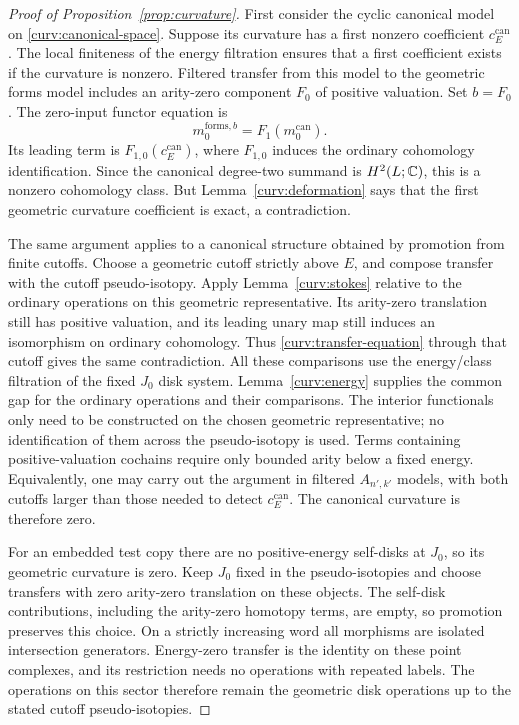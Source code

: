 \begin{proof}[Proof of Proposition~\ref{prop:curvature}]
First consider the cyclic canonical model on
\eqref{curv:canonical-space}.  Suppose its curvature has a first
nonzero coefficient $c_E^{\mathrm{can}}$.  The local finiteness of
the energy filtration ensures that a first coefficient exists if the
curvature is nonzero.  Filtered transfer from this model to the
geometric forms model includes an arity-zero component $F_0$ of
positive valuation.  Set $b=F_0$.  The zero-input functor equation is
\begin{equation}\label{curv:transfer-equation}
 m_0^{\mathrm{forms},b}
       =F_1(m_0^{\mathrm{can}}).
\end{equation}
Its leading term is
$F_{1,0}(c_E^{\mathrm{can}})$, where $F_{1,0}$ induces the ordinary
cohomology identification.  Since the canonical degree-two summand
is $H^2(L;\mathbb C)$, this is a nonzero cohomology class.  But
Lemma~\ref{curv:deformation} says that the first geometric curvature
coefficient is exact, a contradiction.

The same argument applies to a canonical structure obtained by
promotion from finite cutoffs.  Choose a geometric cutoff strictly above $E$, and compose transfer
with the cutoff pseudo-isotopy.  Apply Lemma~\ref{curv:stokes}
relative to the ordinary operations on this geometric representative.  Its arity-zero
translation still has positive valuation, and its leading unary map
still induces an isomorphism on ordinary cohomology.  Thus
\eqref{curv:transfer-equation} through that cutoff gives the same
contradiction.  All these comparisons use the energy/class filtration
of the fixed $J_0$ disk system.  Lemma~\ref{curv:energy} supplies the common gap for the ordinary
operations and their comparisons.  The interior functionals only
need to be constructed on the chosen geometric representative; no
identification of them across the pseudo-isotopy is used.  Terms containing positive-valuation cochains require
only bounded arity below a fixed energy.  Equivalently, one may carry
out the argument in filtered $A_{n',k'}$ models, with both cutoffs
larger than those needed to detect $c_E^{\mathrm{can}}$.
The canonical curvature is therefore zero.

For an embedded test copy there are no positive-energy self-disks
at $J_0$, so its geometric curvature is zero.  Keep $J_0$ fixed in
the pseudo-isotopies and choose transfers with zero arity-zero
translation on these objects.  The self-disk contributions, including
the arity-zero homotopy terms, are empty, so promotion preserves this
choice.  On a strictly increasing word all morphisms are isolated
intersection generators.  Energy-zero transfer is the identity on
these point complexes, and its restriction needs no operations with
repeated labels.  The operations on this sector therefore remain the
geometric disk operations up to the stated cutoff pseudo-isotopies.


\end{proof}
